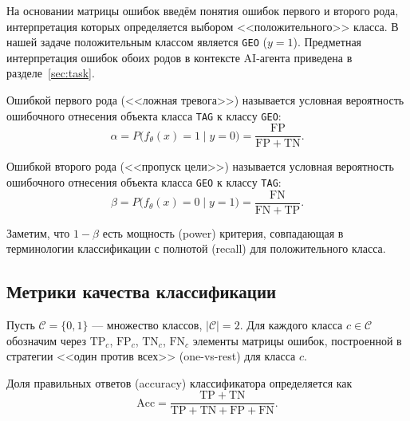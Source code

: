 На основании матрицы ошибок введём понятия ошибок первого и второго рода,
интерпретация которых определяется выбором <<положительного>> класса.
В нашей задаче положительным классом является \texttt{GEO} ($y = 1$).
Предметная интерпретация ошибок обоих родов в контексте AI-агента приведена
в разделе~\ref{sec:task}.

\begin{definition}
\label{def:type-i-error}
Ошибкой первого рода (<<ложная тревога>>) называется условная вероятность
ошибочного отнесения объекта класса \texttt{TAG} к классу \texttt{GEO}:
\begin{equation}
    \alpha = P\bigl(f_\theta(x) = 1 \mid y = 0\bigr)
            = \frac{\mathrm{FP}}{\mathrm{FP} + \mathrm{TN}}.
    \label{eq:type-i}
\end{equation}
\end{definition}

\begin{definition}
\label{def:type-ii-error}
Ошибкой второго рода (<<пропуск цели>>) называется условная вероятность
ошибочного отнесения объекта класса \texttt{GEO} к классу \texttt{TAG}:
\begin{equation}
    \beta = P\bigl(f_\theta(x) = 0 \mid y = 1\bigr)
           = \frac{\mathrm{FN}}{\mathrm{FN} + \mathrm{TP}}.
    \label{eq:type-ii}
\end{equation}
\end{definition}

Заметим, что $1 - \beta$ есть мощность (power) критерия, совпадающая в
терминологии классификации с полнотой (recall) для положительного класса.


\subsection{Метрики качества классификации}
\label{subsec:metrics}

Пусть $\mathcal{C} = \{0, 1\}$ --- множество классов,
$|\mathcal{C}| = 2$. Для каждого класса $c \in \mathcal{C}$ обозначим
через $\mathrm{TP}_c$, $\mathrm{FP}_c$, $\mathrm{TN}_c$, $\mathrm{FN}_c$
элементы матрицы ошибок, построенной в стратегии <<один против всех>>
(one-vs-rest) для класса $c$.

\begin{definition}[Accuracy]
\label{def:accuracy}
Доля правильных ответов (accuracy) классификатора определяется как
\begin{equation}
    \mathrm{Acc} = \frac{\mathrm{TP} + \mathrm{TN}}
                        {\mathrm{TP} + \mathrm{TN} + \mathrm{FP} + \mathrm{FN}}.
    \label{eq:accuracy}
\end{equation}
\end{definition}

